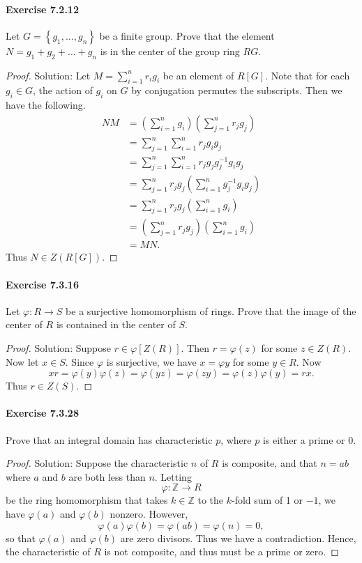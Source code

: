 \documentclass{article}
\theoremstyle{definition}
\begin{document}
\paragraph{Exercise 7.2.12} Let $G=\left\{g_{1}, \ldots, g_{n}\right\}$ be a finite group. Prove that the element $N=g_{1}+g_{2}+\ldots+g_{n}$ is in the center of the group ring $R G$.
\begin{proof}
    Solution: Let $M=\sum_{i=1}^n r_i g_i$ be an element of $R[G]$. Note that for each $g_i \in G$, the action of $g_i$ on $G$ by conjugation permutes the subscripts. Then we have the following.
$$
\begin{aligned}
N M &=\left(\sum_{i=1}^n g_i\right)\left(\sum_{j=1}^n r_j g_j\right) \\
&=\sum_{j=1}^n \sum_{i=1}^n r_j g_i g_j \\
&=\sum_{j=1}^n \sum_{i=1}^n r_j g_j g_j^{-1} g_i g_j \\
&=\sum_{j=1}^n r_j g_j\left(\sum_{i=1}^n g_j^{-1} g_i g_j\right) \\
&=\sum_{j=1}^n r_j g_j\left(\sum_{i=1}^n g_i\right) \\
&=\left(\sum_{j=1}^n r_j g_j\right)\left(\sum_{i=1}^n g_i\right) \\
&=M N .
\end{aligned}
$$
Thus $N \in Z(R[G])$.
\end{proof}


\paragraph{Exercise 7.3.16} Let $\varphi: R \rightarrow S$ be a surjective homomorphism of rings. Prove that the image of the center of $R$ is contained in the center of $S$.
\begin{proof}
    Solution: Suppose $r \in \varphi[Z(R)]$. Then $r=\varphi(z)$ for some $z \in Z(R)$. Now let $x \in S$. Since $\varphi$ is surjective, we have $x=\varphi y$ for some $y \in R$. Now
$$
x r=\varphi(y) \varphi(z)=\varphi(y z)=\varphi(z y)=\varphi(z) \varphi(y)=r x .
$$
Thus $r \in Z(S)$.
\end{proof}


\paragraph{Exercise 7.3.28} Prove that an integral domain has characteristic $p$, where $p$ is either a prime or 0.
\begin{proof}
    Solution: Suppose the characteristic $n$ of $R$ is composite, and that $n=a b$ where $a$ and $b$ are both less than $n$. Letting
$$
\varphi: \mathbb{Z} \rightarrow R
$$
be the ring homomorphism that takes $k \in \mathbb{Z}$ to the $k$-fold sum of 1 or $-1$, we have $\varphi(a)$ and $\varphi(b)$ nonzero. However,
$$
\varphi(a) \varphi(b)=\varphi(a b)=\varphi(n)=0,
$$
so that $\varphi(a)$ and $\varphi(b)$ are zero divisors. Thus we have a contradiction.
Hence, the characteristic of $R$ is not composite, and thus must be a prime or zero.
\end{proof}
\end{document}
